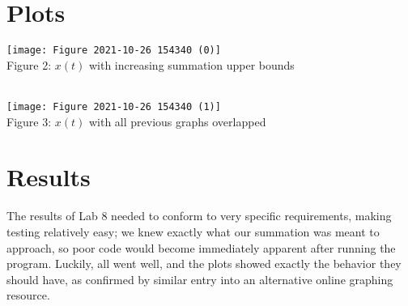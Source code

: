 \documentclass[12pt]{report}
\begin{document}
\section{Plots}

\begin{center}
    \texttt{[image: Figure 2021-10-26 154340 (0)]}\\
    Figure 2: $x(t)$ with increasing summation upper bounds\\~\\
\end{center}
\begin{center}
    \texttt{[image: Figure 2021-10-26 154340 (1)]}\\
    Figure 3: $x(t)$ with all previous graphs overlapped
\end{center}

\section{Results}
The results of Lab 8 needed to conform to very specific requirements, making testing relatively easy; we knew exactly what our summation was meant to approach, so poor code would become immediately apparent after running the program. Luckily, all went well, and the plots showed exactly the behavior they should have, as confirmed by similar entry into an alternative online graphing resource.
\end{document}
